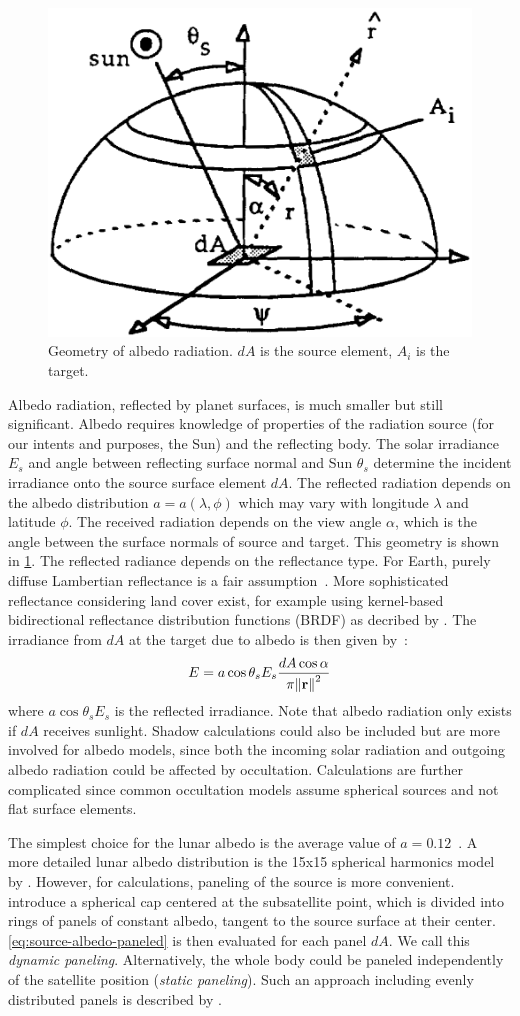 \documentclass[parskip=full,DIV=15]{scrartcl}
\begin{document}
\begin{figure}[ht]
   \centering
   \includegraphics[width=.3\linewidth]{figures/earth_panel_irradiance.png}
   \caption{Geometry of albedo radiation. $dA$ is the source element, $A_i$ is the target.}
   \label{fig:albedo-geometry}
\end{figure}

Albedo radiation, reflected by planet surfaces, is much smaller but still significant. Albedo requires knowledge of properties of the radiation source (for our intents and purposes, the Sun) and the reflecting body. The solar irradiance $E_s$ and angle between reflecting surface normal and Sun $\theta_s$ determine the incident irradiance onto the source surface element $dA$. The reflected radiation depends on the albedo distribution $a=a(\lambda, \phi)$ which may vary with longitude $\lambda$ and latitude $\phi$. The received radiation depends on the view angle $\alpha$, which is the angle between the surface normals of source and target. This geometry is shown in \cref{fig:albedo-geometry}. The reflected radiance depends on the reflectance type. For Earth, purely diffuse Lambertian reflectance is a fair assumption~\cite{Knocke1988}. More sophisticated reflectance considering land cover exist, for example using kernel-based bidirectional reflectance distribution functions (BRDF) as decribed by \textcite{Lucht2000}. The irradiance from $dA$ at the target due to albedo is then given by~\cite{Knocke1988}:
\begin{align}\label{eq:source-albedo-paneled}
   E = a\cos\theta_s E_s\frac{dA\cos\alpha}{\pi \norm{\vb r}^2}
\end{align}
where $a\cos\theta_s E_s$ is the reflected irradiance. Note that albedo radiation only exists if $dA$ receives sunlight. Shadow calculations could also be included but are more involved for albedo models, since both the incoming solar radiation and outgoing albedo radiation could be affected by occultation. Calculations are further complicated since common occultation models assume spherical sources and not flat surface elements.

The simplest choice for the lunar albedo is the average value of $a=0.12$~\cite{Mueller2021}. A more detailed lunar albedo distribution is the 15x15 spherical harmonics model by \textcite{Floberghagen1999}. However, for calculations, paneling of the source is more convenient. \textcite{Knocke1988} introduce a spherical cap centered at the subsatellite point, which is divided into rings of panels of constant albedo, tangent to the source surface at their center. \cref{eq:source-albedo-paneled} is then evaluated for each panel $dA$. We call this \emph{dynamic paneling}. Alternatively, the whole body could be paneled independently of the satellite position (\emph{static paneling}). Such an approach including evenly distributed panels is described by \textcite{Wetterer2014}.
\end{document}
